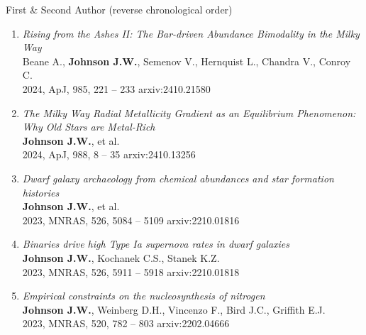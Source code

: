 \documentclass[cv.tex]{subfiles}
\begin{document}
%
\noindent
{\color{themecolor} \large First \& Second Author}
(reverse chronological order)
\par\noindent
\begin{enumerate}

	\vspace{-3mm}

	\item \textit{Rising from the Ashes II: The Bar-driven Abundance Bimodality
	in the Milky Way}
	\\
	Beane A., \textbf{Johnson J.W.}, Semenov V., Hernquist L., Chandra V.,
	Conroy C.
	\\
	2024, ApJ, 985, 221 -- 233 \hfill arxiv:2410.21580

	\item \textit{The Milky Way Radial Metallicity Gradient as an Equilibrium
	Phenomenon: Why Old Stars are Metal-Rich}
	\\
	\textbf{Johnson J.W.}, et al.
	\\
	2024, ApJ, 988, 8 -- 35 \hfill arxiv:2410.13256

	\item \textit{Dwarf galaxy archaeology from chemical abundances and star
	formation histories}
	\\
	\textbf{Johnson J.W.}, et al.
	\\
	2023, MNRAS, 526, 5084 -- 5109 \hfill arxiv:2210.01816

	\item \textit{Binaries drive high Type Ia supernova rates in dwarf
	galaxies}
	\\
	\textbf{Johnson J.W.}, Kochanek C.S., Stanek K.Z.
	\\
	2023, MNRAS, 526, 5911 -- 5918 \hfill arxiv:2210.01818

	\item \textit{Empirical constraints on the nucleosynthesis of nitrogen}
	\\
	\textbf{Johnson J.W.}, Weinberg D.H., Vincenzo F., Bird J.C., Griffith E.J.
	\\
	2023, MNRAS, 520, 782 -- 803 \hfill arxiv:2202.04666


\end{enumerate}
\end{document}
